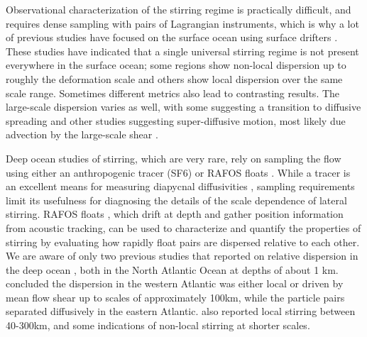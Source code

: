 \documentclass[]{ametsoc}
\begin{document}
Observational characterization of the stirring regime is practically difficult, and requires dense sampling with pairs of Lagrangian instruments, which is why a lot of previous studies have focused on the surface ocean using surface drifters \citep{lacasce2003relative, koszalka2009relative, lumpkin2010surface, poje2014submesoscale, van2015pairwise, vera2016, Corrado2017, essink2019can}. These studies have indicated that a single universal stirring regime is not present everywhere in the surface ocean; some regions show non-local dispersion up to roughly the deformation scale and others show local dispersion over the same scale range. Sometimes different metrics also lead to contrasting results. The large-scale dispersion varies as well, with some suggesting a transition to diffusive spreading \cite[e.g][]{koszalka2009relative} and other studies suggesting super-diffusive motion, most likely due advection by the large-scale shear \cite[e.g][]{lacasce2003relative}. 

Deep ocean studies of stirring, which are very rare, rely on sampling the flow using either an anthropogenic tracer (SF6) \citep{ledwell1998mixing,watson2013rapid} or RAFOS floats \citep{rossby1986rafos}. While a tracer is an excellent means for measuring diapycnal diffusivities \citep{ledwell2000evidence,watson2013rapid, ledwell2016dispersion}, sampling requirements limit its usefulness for diagnosing the details of the scale dependence of lateral stirring. RAFOS floats \citep{swift1994rafos}, which drift at depth and gather position information from acoustic tracking, can be used to characterize and quantify the properties of stirring by evaluating how rapidly float pairs are dispersed relative to each other. We are aware of only two previous studies that reported on relative dispersion in the deep ocean \citep{lacasce2000relative, ollitrault2005open}, both in the North Atlantic Ocean at depths of about 1 km. \citet{lacasce2000relative} concluded the dispersion in the western Atlantic was either local or driven by mean flow shear up to scales of approximately 100km, while the particle pairs separated diffusively in the eastern Atlantic. \citet{ollitrault2005open} also reported local stirring between 40-300km, and some indications of non-local stirring at shorter scales. 
\end{document}
